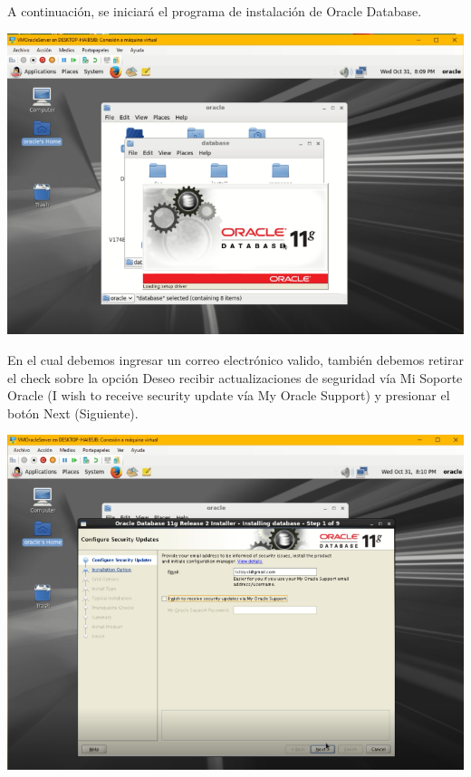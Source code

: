 A continuación, se iniciará el programa de instalación de Oracle Database.
\begin{center}
	\includegraphics[width=15cm]{./Imagenes/69} 
\end{center} 

\vspace{\baselineskip}

En el cual debemos ingresar un correo electrónico valido, también debemos retirar el check sobre la opción Deseo recibir actualizaciones de seguridad vía Mi Soporte Oracle (I wish to receive security update vía My Oracle Support) y presionar el botón Next (Siguiente).
\begin{center}
	\includegraphics[width=14.8cm]{./Imagenes/70} 
\end{center} 

\vspace{\baselineskip}

